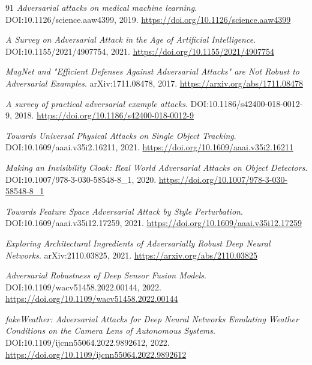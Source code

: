 \documentclass[11pt,a4paper]{article}
\begin{document}
\begin{thebibliography}{91}
\newblock \emph{Adversarial attacks on medical machine learning}.
\newblock DOI:10.1126/science.aaw4399, 2019.
\newblock \url{https://doi.org/10.1126/science.aaw4399}

\newblock \emph{A Survey on Adversarial Attack in the Age of Artificial Intelligence}.
\newblock DOI:10.1155/2021/4907754, 2021.
\newblock \url{https://doi.org/10.1155/2021/4907754}

\newblock \emph{MagNet and "Efficient Defenses Against Adversarial Attacks" are Not Robust to Adversarial Examples}.
\newblock arXiv:1711.08478, 2017.
\newblock \url{https://arxiv.org/abs/1711.08478}

\newblock \emph{A survey of practical adversarial example attacks}.
\newblock DOI:10.1186/s42400-018-0012-9, 2018.
\newblock \url{https://doi.org/10.1186/s42400-018-0012-9}

\newblock \emph{Towards Universal Physical Attacks on Single Object Tracking}.
\newblock DOI:10.1609/aaai.v35i2.16211, 2021.
\newblock \url{https://doi.org/10.1609/aaai.v35i2.16211}

\newblock \emph{Making an Invisibility Cloak: Real World Adversarial Attacks on Object Detectors}.
\newblock DOI:10.1007/978-3-030-58548-8\_1, 2020.
\newblock \url{https://doi.org/10.1007/978-3-030-58548-8_1}

\newblock \emph{Towards Feature Space Adversarial Attack by Style Perturbation}.
\newblock DOI:10.1609/aaai.v35i12.17259, 2021.
\newblock \url{https://doi.org/10.1609/aaai.v35i12.17259}

\newblock \emph{Exploring Architectural Ingredients of Adversarially Robust Deep Neural Networks}.
\newblock arXiv:2110.03825, 2021.
\newblock \url{https://arxiv.org/abs/2110.03825}

\newblock \emph{Adversarial Robustness of Deep Sensor Fusion Models}.
\newblock DOI:10.1109/wacv51458.2022.00144, 2022.
\newblock \url{https://doi.org/10.1109/wacv51458.2022.00144}

\newblock \emph{fakeWeather: Adversarial Attacks for Deep Neural Networks Emulating Weather Conditions on the Camera Lens of Autonomous Systems}.
\newblock DOI:10.1109/ijcnn55064.2022.9892612, 2022.
\newblock \url{https://doi.org/10.1109/ijcnn55064.2022.9892612}


\end{thebibliography}
\end{document}
